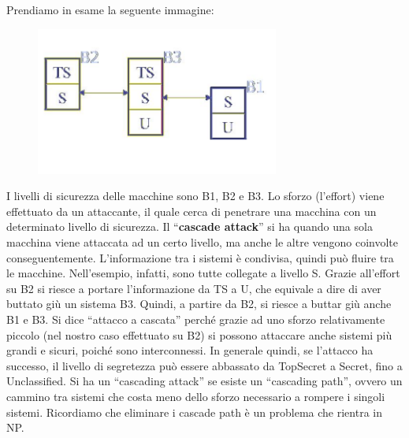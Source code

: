 Prendiamo in esame la seguente immagine:
\begin{figure}[H]
      \centering
      \includegraphics[width=8cm, keepaspectratio]{capitoli/policy/imgs/cascade1.png}
\end{figure}
I livelli di sicurezza delle macchine sono B1, B2 e B3. Lo
sforzo (l'effort) viene effettuato da un attaccante, il quale
cerca di penetrare una macchina con un determinato livello
di sicurezza.
Il “\textbf{cascade attack}” si ha quando una sola macchina viene attaccata ad
un certo livello, ma anche
le altre vengono coinvolte conseguentemente.
L'informazione tra i sistemi è condivisa, quindi può fluire tra le macchine.
Nell'esempio, infatti, sono
tutte collegate a livello S. Grazie all'effort su B2 si riesce a portare
l'informazione da TS a U, che
equivale a dire di aver buttato giù un sistema B3. Quindi, a partire da B2,
si riesce a buttar giù
anche B1 e B3.
Si dice “attacco a cascata” perché grazie ad uno sforzo relativamente piccolo
(nel nostro caso
effettuato su B2) si possono attaccare anche sistemi più grandi e sicuri,
poiché sono interconnessi.
In generale quindi, se l'attacco ha successo, il livello di segretezza può
essere abbassato da
TopSecret a Secret, fino a Unclassified.
Si ha un “cascading attack” se esiste un “cascading path”, ovvero un cammino
tra sistemi che
costa meno dello sforzo necessario a rompere i singoli sistemi.
Ricordiamo che eliminare i cascade path è un problema che rientra in NP.

